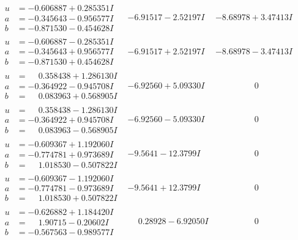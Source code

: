 \documentclass[1p]{elsarticle_modified}
\theoremstyle{definition}
\begin{document}
$$\begin{array}{c|c|c}
\begin{aligned}
u &= -0.606887 + 0.285351 I \\
a &= -0.345643 - 0.956577 I \\
b &= -0.871530 - 0.454628 I\end{aligned}
 & -6.91517 - 2.52197 I & -8.68978 + 3.47413 I \\ \hline\begin{aligned}
u &= -0.606887 - 0.285351 I \\
a &= -0.345643 + 0.956577 I \\
b &= -0.871530 + 0.454628 I\end{aligned}
 & -6.91517 + 2.52197 I & -8.68978 - 3.47413 I \\ \hline\begin{aligned}
u &= \phantom{-}0.358438 + 1.286130 I \\
a &= -0.364922 - 0.945708 I \\
b &= \phantom{-}0.083963 + 0.568905 I\end{aligned}
 & -6.92560 + 5.09330 I & \phantom{-0.000000 } 0 \\ \hline\begin{aligned}
u &= \phantom{-}0.358438 - 1.286130 I \\
a &= -0.364922 + 0.945708 I \\
b &= \phantom{-}0.083963 - 0.568905 I\end{aligned}
 & -6.92560 - 5.09330 I & \phantom{-0.000000 } 0 \\ \hline\begin{aligned}
u &= -0.609367 + 1.192060 I \\
a &= -0.774781 + 0.973689 I \\
b &= \phantom{-}1.018530 - 0.507822 I\end{aligned}
 & -9.5641 - 12.3799 I & \phantom{-0.000000 } 0 \\ \hline\begin{aligned}
u &= -0.609367 - 1.192060 I \\
a &= -0.774781 - 0.973689 I \\
b &= \phantom{-}1.018530 + 0.507822 I\end{aligned}
 & -9.5641 + 12.3799 I & \phantom{-0.000000 } 0 \\ \hline\begin{aligned}
u &= -0.626882 + 1.184420 I \\
a &= \phantom{-}1.90715 - 0.20602 I \\
b &= -0.567563 - 0.989577 I\end{aligned}
 & \phantom{-}0.28928 - 6.92050 I & \phantom{-0.000000 } 0 \\ \hline\begin{aligned}

\end{aligned}
\end{array}$$
\end{document}
